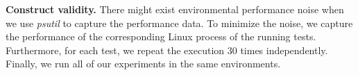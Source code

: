 

\noindent \textbf{Construct validity.} %
There might exist environmental performance noise when we use \emph{psutil} to capture the performance data. To minimize the noise, we capture the performance of the corresponding Linux process of the running tests. Furthermore, for each test, we repeat the execution 30 times independently. %
Finally, we run all of our experiments in the same environments. %
